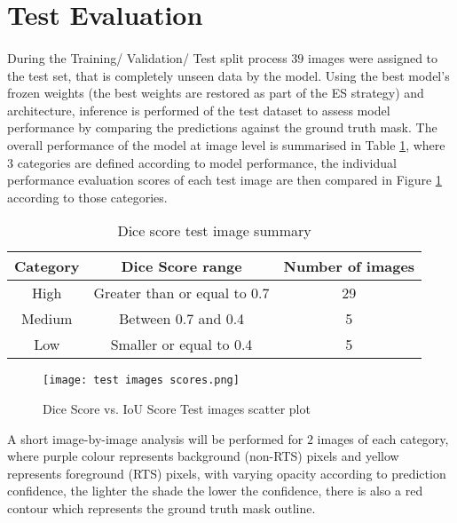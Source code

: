 \section{Test Evaluation}
\paragraph{}
During the Training/ Validation/ Test split process $39$ images were assigned to the test set, that is completely unseen data by the model. Using the best model's frozen weights (the best weights are restored as part of the \gls{ES} strategy) and architecture, inference is performed of the test dataset to assess model performance by comparing the predictions against the ground truth mask.
The overall performance of the model at image level is summarised in Table \ref{sum_test}, where $3$ categories are defined according to model performance, the individual performance evaluation scores of each test image are then compared in Figure \ref{scatter_test_scores} according to those categories.
    \begin{table}[!h] 
        \begin{center}
        \begin{tabular}{ccc} 
        \toprule
        \textbf{Category} & \textbf{Dice Score range}  & \textbf{Number of images}  \\ \midrule
        High & Greater than or equal to 0.7 & 29  \\
        Medium & Between 0.7 and 0.4 & 5  \\
        Low & Smaller or equal to 0.4 & 5  \\
    \bottomrule
        \end{tabular}
      \end{center} 
      \caption{Dice score test image summary}\label{sum_test}
    \end{table}
    \begin{figure}[hbt!]
        \centering
        \texttt{[image: test images scores.png]}
        \caption{Dice Score vs. \gls{IoU} Score Test images scatter plot}
        \label{scatter_test_scores}
    \end{figure}

A short image-by-image analysis will be performed for $2$ images of each category, where purple colour represents background (non-\gls{RTS}) pixels and yellow represents foreground (\gls{RTS}) pixels, with varying opacity according to prediction confidence, the lighter the shade the lower the confidence, there is also a red contour which represents the ground truth mask outline.

